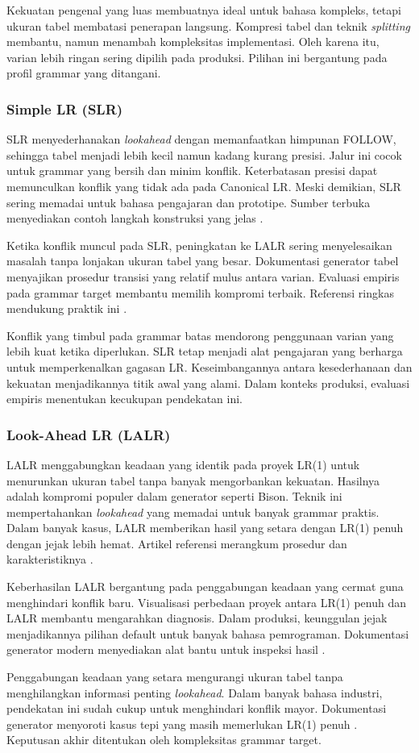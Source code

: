 \documentclass[../main.tex]{subfiles}
\begin{document}
Kekuatan pengenal yang luas membuatnya ideal untuk bahasa kompleks, tetapi ukuran tabel membatasi penerapan langsung. Kompresi tabel dan teknik \emph{splitting} membantu, namun menambah kompleksitas implementasi. Oleh karena itu, varian lebih ringan sering dipilih pada produksi. Pilihan ini bergantung pada profil grammar yang ditangani.

\subsubsection{Simple LR (SLR)}
SLR menyederhanakan \emph{lookahead} dengan memanfaatkan himpunan FOLLOW, sehingga tabel menjadi lebih kecil namun kadang kurang presisi. Jalur ini cocok untuk grammar yang bersih dan minim konflik. Keterbatasan presisi dapat memunculkan konflik yang tidak ada pada Canonical LR. Meski demikian, SLR sering memadai untuk bahasa pengajaran dan prototipe. Sumber terbuka menyediakan contoh langkah konstruksi yang jelas \citep{WikiSLR}.

Ketika konflik muncul pada SLR, peningkatan ke LALR sering menyelesaikan masalah tanpa lonjakan ukuran tabel yang besar. Dokumentasi generator tabel menyajikan prosedur transisi yang relatif mulus antara varian. Evaluasi empiris pada grammar target membantu memilih kompromi terbaik. Referensi ringkas mendukung praktik ini \citep{WikiSLR}.

Konflik yang timbul pada grammar batas mendorong penggunaan varian yang lebih kuat ketika diperlukan. SLR tetap menjadi alat pengajaran yang berharga untuk memperkenalkan gagasan LR. Keseimbangannya antara kesederhanaan dan kekuatan menjadikannya titik awal yang alami. Dalam konteks produksi, evaluasi empiris menentukan kecukupan pendekatan ini.

\subsubsection{Look-Ahead LR (LALR)}
LALR menggabungkan keadaan yang identik pada proyek LR(1) untuk menurunkan ukuran tabel tanpa banyak mengorbankan kekuatan. Hasilnya adalah kompromi populer dalam generator seperti Bison. Teknik ini mempertahankan \emph{lookahead} yang memadai untuk banyak grammar praktis. Dalam banyak kasus, LALR memberikan hasil yang setara dengan LR(1) penuh dengan jejak lebih hemat. Artikel referensi merangkum prosedur dan karakteristiknya \citep{WikiLALR}.

Keberhasilan LALR bergantung pada penggabungan keadaan yang cermat guna menghindari konflik baru. Visualisasi perbedaan proyek antara LR(1) penuh dan LALR membantu mengarahkan diagnosis. Dalam produksi, keunggulan jejak menjadikannya pilihan default untuk banyak bahasa pemrograman. Dokumentasi generator modern menyediakan alat bantu untuk inspeksi hasil \citep{BisonManual}.

Penggabungan keadaan yang setara mengurangi ukuran tabel tanpa menghilangkan informasi penting \emph{lookahead}. Dalam banyak bahasa industri, pendekatan ini sudah cukup untuk menghindari konflik mayor. Dokumentasi generator menyoroti kasus tepi yang masih memerlukan LR(1) penuh \citep{WikiLALR}. Keputusan akhir ditentukan oleh kompleksitas grammar target.
\end{document}
